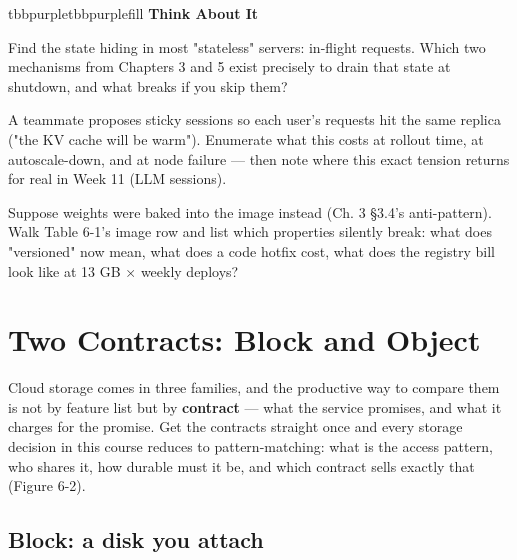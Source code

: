 \begin{calloutbox}{tbbpurple}{tbbpurplefill}
{\normalsize\bfseries\color{tbbpurple}Think About It}\par\vspace{3pt}
\begin{tbbitemize}
  \item Find the state hiding in most "stateless" servers: in-flight requests. Which two mechanisms from Chapters 3 and 5 exist precisely to drain that state at shutdown, and what breaks if you skip them?
  \item A teammate proposes sticky sessions so each user's requests hit the same replica ("the KV cache will be warm"). Enumerate what this costs at rollout time, at autoscale-down, and at node failure — then note where this exact tension returns for real in Week 11 (LLM sessions).
  \item Suppose weights were baked into the image instead (Ch. 3 §3.4's anti-pattern). Walk Table 6-1's image row and list which properties silently break: what does "versioned" now mean, what does a code hotfix cost, what does the registry bill look like at 13 GB × weekly deploys?
\end{tbbitemize}
\end{calloutbox}

\section{Two Contracts: Block and Object}

Cloud storage comes in three families, and the productive way to compare them is not by feature list but by \textbf{contract} — what the service promises, and what it charges for the promise. Get the contracts straight once and every storage decision in this course reduces to pattern-matching: what is the access pattern, who shares it, how durable must it be, and which contract sells exactly that (Figure 6-2).

\subsection*{Block: a disk you attach}

